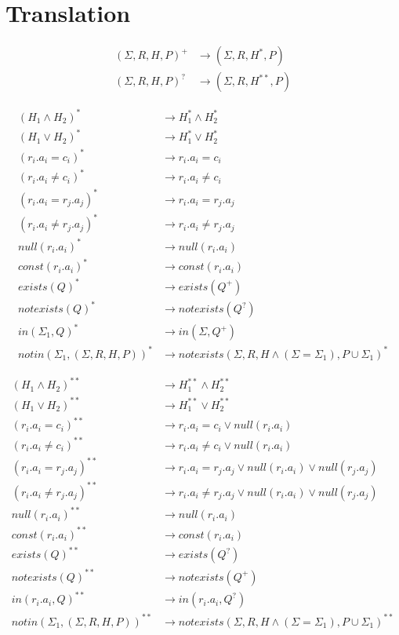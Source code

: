 \section{Translation}

\begin{align*}
	(\Sigma,R,H,P)^+ & \rightarrow (\Sigma,R,H^*,P) \\
	(\Sigma,R,H,P)^? & \rightarrow (\Sigma,R,H^{**},P) 
\end{align*}

\begin{align*}
	(H_1 \land H_2)^* & \rightarrow H_1^* \land H_2^* \\
	(H_1 \lor H_2)^* & \rightarrow H_1^* \lor H_2^* \\
	(r_i.a_i = c_i)^* & \rightarrow r_i.a_i = c_i \\
	(r_i.a_i \neq c_i)^*& \rightarrow r_i.a_i \neq c_i \\
	(r_i.a_i = r_j.a_j)^* & \rightarrow r_i.a_i = r_j.a_j \\
	(r_i.a_i \neq r_j.a_j)^* & \rightarrow r_i.a_i \neq r_j.a_j \\
	null(r_i.a_i)^* & \rightarrow null(r_i.a_i) \\
	const(r_i.a_i)^* & \rightarrow const(r_i.a_i) \\
	exists(Q)^* & \rightarrow exists(Q^+) \\
	notexists(Q)^* & \rightarrow notexists(Q^?) \\
	in(\Sigma_1,Q)^* & \rightarrow in(\Sigma,Q^+) \\
	notin(\Sigma_1,(\Sigma,R,H,P))^* & \rightarrow notexists(\Sigma,R,H \land (\Sigma = \Sigma_1), P\cup\Sigma_1)^* 
\end{align*}

\begin{align*}
	(H_1 \land H_2)^{**} & \rightarrow H_1^{**} \land H_2^{**} \\
	(H_1 \lor H_2)^{**} & \rightarrow H_1^{**} \lor H_2^{**} \\
	(r_i.a_i = c_i)^{**} & \rightarrow r_i.a_i = c_i \lor null(r_i.a_i)\\
	(r_i.a_i \neq c_i)^{**}& \rightarrow r_i.a_i \neq c_i \lor null(r_i.a_i)\\
	(r_i.a_i = r_j.a_j)^{**} & \rightarrow r_i.a_i = r_j.a_j \lor null(r_i.a_i) \lor null(r_j.a_j)\\
	(r_i.a_i \neq r_j.a_j)^{**} & \rightarrow r_i.a_i \neq r_j.a_j  \lor null(r_i.a_i) \lor null(r_j.a_j)\\
	null(r_i.a_i)^{**} & \rightarrow null(r_i.a_i) \\
	const(r_i.a_i)^{**} & \rightarrow const(r_i.a_i) \\
	exists(Q)^{**} & \rightarrow exists(Q^?) \\
	notexists(Q)^{**} & \rightarrow notexists(Q^+) \\
	in(r_i.a_i,Q)^{**} & \rightarrow in(r_i.a_i,Q^?) \\
	notin(\Sigma_1,(\Sigma,R,H,P))^{**} & \rightarrow notexists(\Sigma,R,H \land (\Sigma = \Sigma_1), P\cup\Sigma_1)^{**}
\end{align*}

